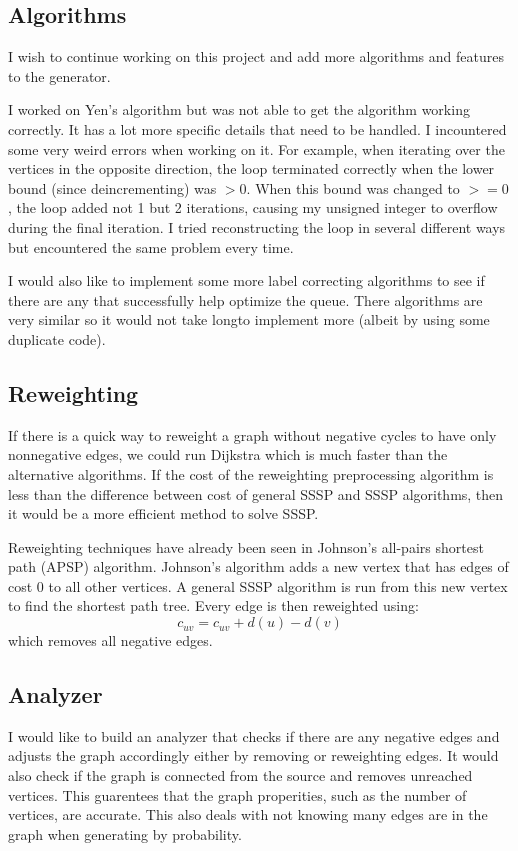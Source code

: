 \documentclass{article}
\begin{document}
\subsection{Algorithms}
I wish to continue working on this project and add more algorithms and features to the generator. 

I worked on Yen's algorithm but was not able to get the algorithm working correctly. It has a lot more specific details that need to be handled. I incountered some very weird errors when working on it. For example, when iterating over the vertices in the opposite direction, the loop terminated correctly when the lower bound (since deincrementing) was $>0$. When this bound was changed to $>=0$, the loop added not 1 but 2 iterations, causing my unsigned integer to overflow during the final iteration. I tried reconstructing the loop in several different ways but encountered the same problem every time.

I would also like to implement some more label correcting algorithms to see if there are any that successfully help optimize the queue. There algorithms are very similar so it would not take longto implement more (albeit by using some duplicate code).

\subsection{Reweighting}
If there is a quick way to reweight a graph without negative cycles to have only nonnegative edges, we could run Dijkstra which is much faster than the alternative algorithms. If the cost of the reweighting preprocessing algorithm is less than the difference between cost of general SSSP and SSSP algorithms, then it would be a more efficient method to solve SSSP.

Reweighting techniques have already been seen in Johnson's all-pairs shortest path (APSP) algorithm. Johnson's algorithm adds a new vertex that has edges of cost 0 to all other vertices. A general SSSP algorithm is run from this new vertex to find the shortest path tree. Every edge is then reweighted using:
\[c_{uv} = c_{uv} + d(u) - d(v)\]
which removes all negative edges.

\subsection{Analyzer}
I would like to build an analyzer that checks if there are any negative edges and adjusts the graph accordingly either by removing or reweighting edges. It would also check if the graph is connected from the source and removes unreached vertices. This guarentees that the graph properities, such as the number of vertices, are accurate. This also deals with not knowing many edges are in the graph when generating by probability. 
\end{document}
